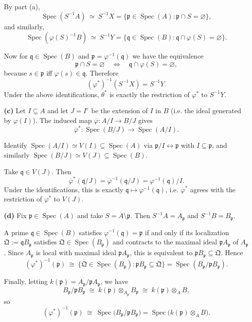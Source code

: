 \documentclass[12pt,a4paper]{article}
\DeclareMathOperator{\Spec}{Spec}
\theoremstyle{plain}
\theoremstyle{definition}      %
\begin{document}
	By part (a),
	\[
	\Spec(S^{-1}A)\ \simeq\ S^{-1}X=\{\mathfrak p\in\Spec(A):\mathfrak p\cap S=\varnothing\},
	\]
	and similarly,
	\[
	\Spec(\varphi(S)^{-1}B)\ \simeq\ S^{-1}Y=\{\mathfrak q\in\Spec(B):\mathfrak q\cap \varphi(S)=\varnothing\}.
	\]
	
	Now for $\mathfrak q\in\Spec(B)$ and $\mathfrak p=\varphi^{-1}(\mathfrak q)$ we have the equivalence
	\[
	\mathfrak p\cap S=\varnothing
	\quad\Longleftrightarrow\quad
	\mathfrak q\cap \varphi(S)=\varnothing,
	\]
	because $s\in \mathfrak p$ iff $\varphi(s)\in \mathfrak q$.
	Therefore
	\[
	(\varphi^*)^{-1}(S^{-1}X)=S^{-1}Y.
	\]
	Under the above identifications, $\theta^*$ is exactly the restriction of $\varphi^*$ to $S^{-1}Y$.
	
	\bigskip
	\textbf{(c)}
	Let $I\subseteq A$ and let $J=I^e$ be the extension of $I$ in $B$ (i.e. the ideal generated by $\varphi(I)$).
	The induced map $\overline{\varphi}:A/I\to B/J$ gives
	\[
	\overline{\varphi}^*:\Spec(B/J)\to \Spec(A/I).
	\]
	
	Identify $\Spec(A/I)\simeq V(I)\subseteq \Spec(A)$ via $\mathfrak p/I\leftrightarrow \mathfrak p$ with $I\subseteq \mathfrak p$,
	and similarly $\Spec(B/J)\simeq V(J)\subseteq \Spec(B)$.
	
	Take $\mathfrak q\in V(J)$.
	Then
	\[
	\overline{\varphi}^*(\mathfrak q/J)
	=
	\overline{\varphi}^{-1}(\mathfrak q/J)
	=
	\varphi^{-1}(\mathfrak q)/I.
	\]
	Under the identifications, this is exactly $\mathfrak q\mapsto \varphi^{-1}(\mathfrak q)$, i.e.
	$\overline{\varphi}^*$ agrees with the restriction of $\varphi^*$ to $V(J)$.
	
	\bigskip
	\textbf{(d)}
	Fix $\mathfrak p\in\Spec(A)$ and take $S=A\setminus \mathfrak p$. Then $S^{-1}A=A_{\mathfrak p}$ and
	$S^{-1}B=B_{\mathfrak p}$.
	
	A prime $\mathfrak q\in\Spec(B)$ satisfies $\varphi^{-1}(\mathfrak q)=\mathfrak p$ if and only if its localization
	$\mathfrak Q:=\mathfrak qB_{\mathfrak p}$ satisfies $\mathfrak Q\in\Spec(B_{\mathfrak p})$ and contracts to the maximal ideal
	$\mathfrak pA_{\mathfrak p}$ of $A_{\mathfrak p}$.
	Since $A_{\mathfrak p}$ is local with maximal ideal $\mathfrak pA_{\mathfrak p}$, this is equivalent to
	$\mathfrak pB_{\mathfrak p}\subseteq \mathfrak Q$.
	Hence
	\[
	(\varphi^*)^{-1}(\mathfrak p)\ \cong\ \{\mathfrak Q\in\Spec(B_{\mathfrak p}) : \mathfrak pB_{\mathfrak p}\subseteq \mathfrak Q\}
	=\Spec(B_{\mathfrak p}/\mathfrak pB_{\mathfrak p}).
	\]
	
	Finally, letting $k(\mathfrak p)=A_{\mathfrak p}/\mathfrak pA_{\mathfrak p}$, we have
	\[
	B_{\mathfrak p}/\mathfrak pB_{\mathfrak p}
	\;\cong\;
	k(\mathfrak p)\otimes_{A_{\mathfrak p}} B_{\mathfrak p}
	\;\cong\;
	k(\mathfrak p)\otimes_A B,
	\]
	so
	\[
	(\varphi^*)^{-1}(\mathfrak p)\ \cong\ \Spec\bigl(B_{\mathfrak p}/\mathfrak pB_{\mathfrak p}\bigr)
	=\Spec\bigl(k(\mathfrak p)\otimes_A B\bigr).
	\]
	
\end{document}

